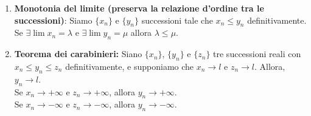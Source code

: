 \documentclass[a4paper]{article}
\begin{document}
{\begin{enumerate}
        esistono intorni \(I\) di \(\lambda\) e \(J\) di \(\mu\) tale che
        \[
            I \subseteq (-\infty, a)
        \]
        e
        \[
            J \subseteq (b, +\infty)
        \]
        Per definizione di limite:
        \begin{itemize}
            \item \[x_n \to \lambda \implies \exists N_1 \,|\, \forall n \geq N_1, x_n \in I \subseteq (-\infty, a)\]
            \item \[y_n \to \lambda \implies \exists N_2 \,|\, \forall n \geq N_2, y_n \in J \subseteq (b, +\infty)\]
        \end{itemize}
        Quindi, se \(n \geq N = \max\{N_1, N_2\}\), abbiamo
        \(x_n \in (-\infty, a)\) cioè \(x_n < a\) e \(y\in (b,+\infty)\), cioè \(y_n > b\).
        Nota: perché valga la tesi, deve esserci la disuguaglianza stretta.
        Con \[x_n = \frac{{(-1)}^n}{n} \to 0\]
        Infatti, \(x_n \to 0\) se e solo se \(|x_n| \to 0\)
        \[
            \begin{cases}
                x_n \to 0 & \forall \varepsilon > 0, \exists N \,|\, \forall n \geq N, |x_n - 0| < \varepsilon \\
                |x_n| \to 0 & \forall \varepsilon > 0, \exists N \,|\, \forall n \geq N, ||x_n| - 0| < \varepsilon
            \end{cases}
        \]
        Poichè
        \[
            \left|{(-1)}^n \frac{1}{n}\right| = \frac{1}{n} \to 0
        \]
        poniamo \(y_0 = 0, \forall n\) non vale nè \(x_n \geq 0\) nè \(x_n \leq 0\) definitivamente.

        In particolare, se \(y_n \to \mu > 0\), \(y_n\) è definitivamente strettamente \(> 0\)
        cioè esiste \(N\) tale che \(\forall n \geq N, y_n > 0\) e infatti
        \(\forall b \in (0, \mu)\) esiste \(N\) tale che \(y_n > b, \forall n \geq N\).
        \item \textbf{Monotonia del limite (preserva la relazione d'ordine tra le successioni)}:
        Siamo \(\{x_n\}\) e \(\{y_n\}\) successioni tale che \(x_n \leq y_n\) definitivamente.
        Se \(\exists \lim x_n = \lambda\) e \(\exists \lim y_n = \mu\) allora \(\lambda \leq \mu\).
        \item \textbf{Teorema dei carabinieri:} Siano \(\{x_n\}\), \(\{y_n\}\) e \(\{z_n\}\)
        tre successioni reali con \(x_n \leq y_n \leq z_n\) definitivamente, e supponiamo
        che \(x_n \to l\) e \(z_n \to l\).
        Allora, \(y_n \to l\). \\
        Se \(x_n \to +\infty\) e \(z_n \to +\infty\), allora \(y_n \to +\infty\). \\
        Se \(x_n \to -\infty\) e \(z_n \to -\infty\), allora \(y_n \to -\infty\).
    \end{enumerate}
}
\end{document}
